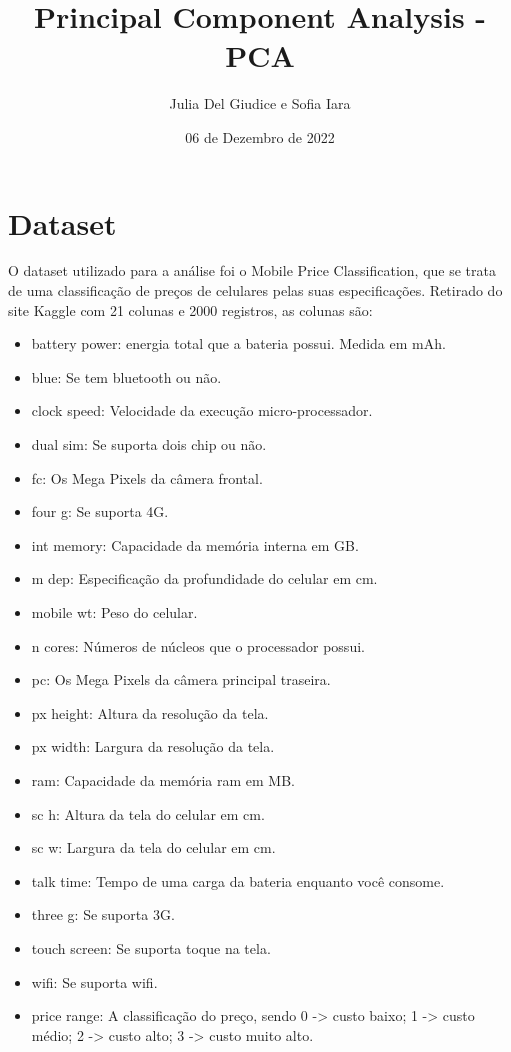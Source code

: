 \documentclass{report}
\title{Principal Component Analysis - PCA}
\author{Julia Del Giudice e Sofia Iara}
\date{06 de Dezembro de 2022}
\begin{document}
\maketitle

\section{Dataset}
O dataset utilizado para a análise foi o Mobile Price Classification, que se trata de uma classificação de preços de celulares pelas suas especificações. Retirado do site Kaggle com 21 colunas e 2000 registros, as colunas são:
\begin{itemize}
\item battery power: energia total que a bateria possui. Medida em mAh.
\item blue: Se tem bluetooth ou não.
\item clock speed: Velocidade da execução micro-processador.
\item dual sim: Se suporta dois chip ou não.
\item fc: Os Mega Pixels da câmera frontal.
\item four g: Se suporta 4G.
\item int memory: Capacidade da memória interna em GB.
\item m dep: Especificação da profundidade do celular em cm.
\item mobile wt: Peso do celular.
\item n cores: Números de núcleos que o processador possui.
\item pc: Os Mega Pixels da câmera principal traseira.
\item px height: Altura da resolução da tela.
\item px width: Largura da resolução da tela.
\item ram: Capacidade da memória ram em MB.
\item sc h: Altura da tela do celular em cm.
\item sc w: Largura da tela do celular em cm.
\item talk time: Tempo de uma carga da bateria enquanto você consome.
\item three g: Se suporta 3G.
\item touch screen: Se suporta toque na tela.
\item wifi: Se suporta wifi.
\item price range: A classificação do preço, sendo 0 -> custo baixo; 1 -> custo médio; 2 -> custo alto; 3 -> custo muito alto.
\end{itemize}
\
\end{document}
